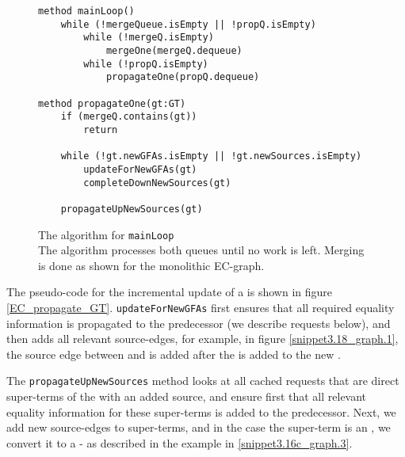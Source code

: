 \begin{figure}
\begin{lstlisting}
method mainLoop()
	while (!mergeQueue.isEmpty || !propQ.isEmpty)
		while (!mergeQ.isEmpty)
			mergeOne(mergeQ.dequeue)
		while (!propQ.isEmpty)
			propagateOne(propQ.dequeue)
	
method propagateOne(gt:GT)
	if (mergeQ.contains(gt))
		return
		
	while (!gt.newGFAs.isEmpty || !gt.newSources.isEmpty)
		updateForNewGFAs(gt)
		completeDownNewSources(gt)
	
	propagateUpNewSources(gt)
\end{lstlisting}
\caption{The algorithm for \lstinline|mainLoop|\\
The algorithm processes both queues until no work is left.
Merging is done as shown for the monolithic EC-graph.
}
\label{EC_mainLoop}
\end{figure}

The pseudo-code for the incremental update of a \GT{} is shown in figure \ref{EC_propagate_GT}.
\lstinline|updateForNewGFAs| first ensures that all required equality information is propagated to the predecessor (we describe requests below),
and then adds all relevant source-edges, for example, in figure \ref{snippet3.18_graph.1}, the source edge between  and  is added after the \GFA{}  is added to the new \GT{}.

The \lstinline|propagateUpNewSources| method looks at all cached requests that are direct super-terms of the \GT{} with an added source, 
and ensure first that all relevant equality information for these super-terms is added to the predecessor. 
Next, we add new source-edges to super-terms, and in the case the super-term is an \RGFA{}, we convert it to a \GT{} - as described in the example in \ref{snippet3.16c_graph.3}.

